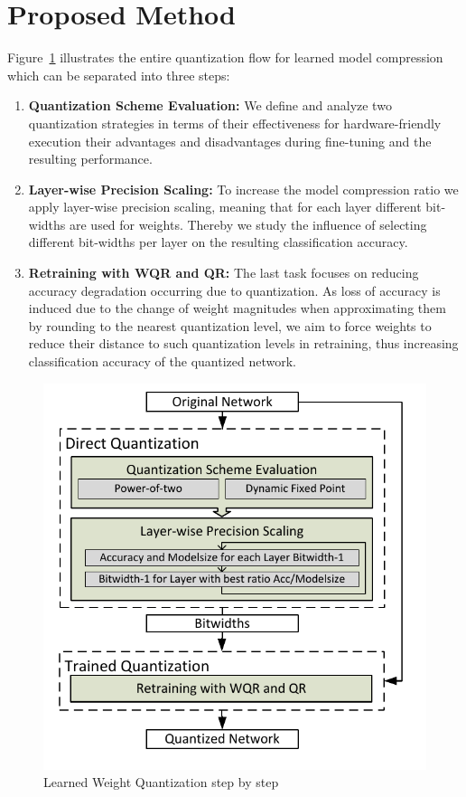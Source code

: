 \section{Proposed Method}
Figure~\ref{fig:process} illustrates the entire quantization flow for learned model compression which can be separated into three steps:

\begin{enumerate}
\item \textbf{Quantization Scheme Evaluation:} We define and analyze two quantization strategies in terms of their effectiveness for hardware-friendly execution their advantages and disadvantages during fine-tuning and the resulting performance.
\item \textbf{Layer-wise Precision Scaling:} To increase the model compression ratio we apply layer-wise precision scaling, meaning that for each layer different bit-widths are used for weights. Thereby we study the influence of selecting different bit-widths per layer on the resulting classification accuracy.
\item \textbf{Retraining with WQR and QR:} The last task focuses on reducing accuracy degradation occurring due to quantization. As loss of accuracy is induced due to the change of weight magnitudes when approximating them by rounding to the nearest quantization level, we aim to force weights to reduce their distance to such quantization levels in retraining, thus increasing classification accuracy of the quantized network.
\end{enumerate}

\begin{figure}[ht!]
\includegraphics[width=\columnwidth]{img/process3.pdf}
\caption{Learned Weight Quantization step by step}\label{fig:process}
\end{figure}

